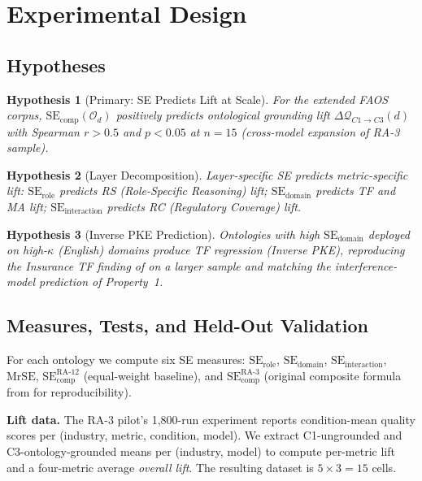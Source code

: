 \documentclass[11pt,a4paper]{article}
\newtheorem{hypothesis}{Hypothesis}
\newcommand{\faos}{\textsc{FAOS}}
\newcommand{\se}{\mathrm{SE}}
\newcommand{\serole}{\se_{\text{role}}}
\newcommand{\sedom}{\se_{\text{domain}}}
\newcommand{\seint}{\se_{\text{interaction}}}
\newcommand{\secomp}{\se_{\text{comp}}}
\newcommand{\mrse}{\mathrm{MrSE}}
\newcommand{\kapp}{\kappa}
\newcommand{\quality}{\mathcal{Q}}
\newcommand{\onto}{\mathcal{O}}
\begin{document}
\section{Experimental Design}
\label{sec:design}

\subsection{Hypotheses}

\begin{hypothesis}[Primary: SE Predicts Lift at Scale]
\label{hyp:primary}
For the extended \faos{} corpus, $\secomp(\onto_d)$ positively predicts
ontological grounding lift $\Delta\quality_{C1 \to C3}(d)$ with Spearman
$r > 0.5$ and $p < 0.05$ at $n = 15$ (cross-model expansion of RA-3
sample).
\end{hypothesis}

\begin{hypothesis}[Layer Decomposition]
\label{hyp:layers}
Layer-specific SE predicts metric-specific lift: $\serole$ predicts RS
(Role-Specific Reasoning) lift; $\sedom$ predicts TF and MA lift;
$\seint$ predicts RC (Regulatory Coverage) lift.
\end{hypothesis}

\begin{hypothesis}[Inverse PKE Prediction]
\label{hyp:ipke}
Ontologies with high $\sedom$ deployed on high-$\kapp$ (English) domains
produce TF regression (Inverse PKE), reproducing the Insurance TF
finding of \citet{luong2026neurosymbolic} on a larger sample and
matching the interference-model prediction of
\citet{luong2026quantum} Property~1.
\end{hypothesis}

\subsection{Measures, Tests, and Held-Out Validation}

For each ontology we compute six SE measures: $\serole$, $\sedom$,
$\seint$, $\mrse$, $\secomp^{\text{RA-12}}$ (equal-weight baseline), and
$\secomp^{\text{RA-3}}$ (original composite formula from
\citet{luong2026neurosymbolic} for reproducibility).

\textbf{Lift data.} The RA-3 pilot's 1{,}800-run experiment reports
condition-mean quality scores per (industry, metric, condition, model).
We extract C1-ungrounded and C3-ontology-grounded means per (industry,
model) to compute per-metric lift and a four-metric average
\emph{overall lift}. The resulting dataset is $5 \times 3 = 15$ cells.
\end{document}
